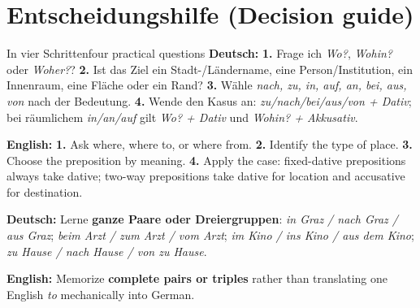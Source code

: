 \documentclass[a4paper,11pt]{article}
\newcommand{\GermanText}[1]{\textbf{Deutsch: }#1\par}
\newcommand{\EnglishText}[1]{{\small\color{SoftGray}\textbf{English: }#1\par}}
\begin{document}
\section{Entscheidungshilfe (Decision guide)}
\begin{grammarentry}{In vier Schritten}{four practical questions}
\GermanText{\textbf{1.} Frage ich \emph{Wo?}, \emph{Wohin?} oder \emph{Woher?}? \textbf{2.} Ist das Ziel ein Stadt-/Ländername, eine Person/Institution, ein Innenraum, eine Fläche oder ein Rand? \textbf{3.} Wähle \emph{nach, zu, in, auf, an, bei, aus, von} nach der Bedeutung. \textbf{4.} Wende den Kasus an: \emph{zu/nach/bei/aus/von + Dativ}; bei räumlichem \emph{in/an/auf} gilt \emph{Wo? + Dativ} und \emph{Wohin? + Akkusativ}.}
\EnglishText{\textbf{1.} Ask where, where to, or where from. \textbf{2.} Identify the type of place. \textbf{3.} Choose the preposition by meaning. \textbf{4.} Apply the case: fixed-dative prepositions always take dative; two-way prepositions take dative for location and accusative for destination.}
\GermanText{Lerne \textbf{ganze Paare oder Dreiergruppen}: \emph{in Graz / nach Graz / aus Graz}; \emph{beim Arzt / zum Arzt / vom Arzt}; \emph{im Kino / ins Kino / aus dem Kino}; \emph{zu Hause / nach Hause / von zu Hause}.}
\EnglishText{Memorize \textbf{complete pairs or triples} rather than translating one English \emph{to} mechanically into German.}
\end{grammarentry}
\end{document}
